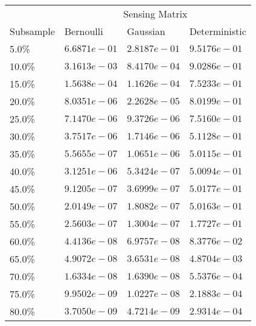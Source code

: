 \begin{tabular}{l|l|l|l}
    & \multicolumn{3}{c}{Sensing Matrix} \\
    Subsample & Bernoulli & Gaussian & Deterministic \\
    \hline
    5.0\% & $6.6871e-01$ & $2.8187e-01$ & $9.5176e-01$ \\
    10.0\% & $3.1613e-03$ & $8.4170e-04$ & $9.0286e-01$ \\
    15.0\% & $1.5638e-04$ & $1.1626e-04$ & $7.5233e-01$ \\
    20.0\% & $8.0351e-06$ & $2.2628e-05$ & $8.0199e-01$ \\
    25.0\% & $7.1470e-06$ & $9.3726e-06$ & $7.5160e-01$ \\
    30.0\% & $3.7517e-06$ & $1.7146e-06$ & $5.1128e-01$ \\
    35.0\% & $5.5655e-07$ & $1.0651e-06$ & $5.0115e-01$ \\
    40.0\% & $3.1251e-06$ & $5.3424e-07$ & $5.0094e-01$ \\
    45.0\% & $9.1205e-07$ & $3.6999e-07$ & $5.0177e-01$ \\
    50.0\% & $2.0149e-07$ & $1.8082e-07$ & $5.0163e-01$ \\
    55.0\% & $2.5603e-07$ & $1.3004e-07$ & $1.7727e-01$ \\
    60.0\% & $4.4136e-08$ & $6.9757e-08$ & $8.3776e-02$ \\
    65.0\% & $4.9072e-08$ & $3.6531e-08$ & $4.8704e-03$ \\
    70.0\% & $1.6334e-08$ & $1.6390e-08$ & $5.5376e-04$ \\
    75.0\% & $9.9502e-09$ & $1.0227e-08$ & $2.1883e-04$ \\
    80.0\% & $3.7050e-09$ & $4.7214e-09$ & $2.9314e-04$ \\
\end{tabular}